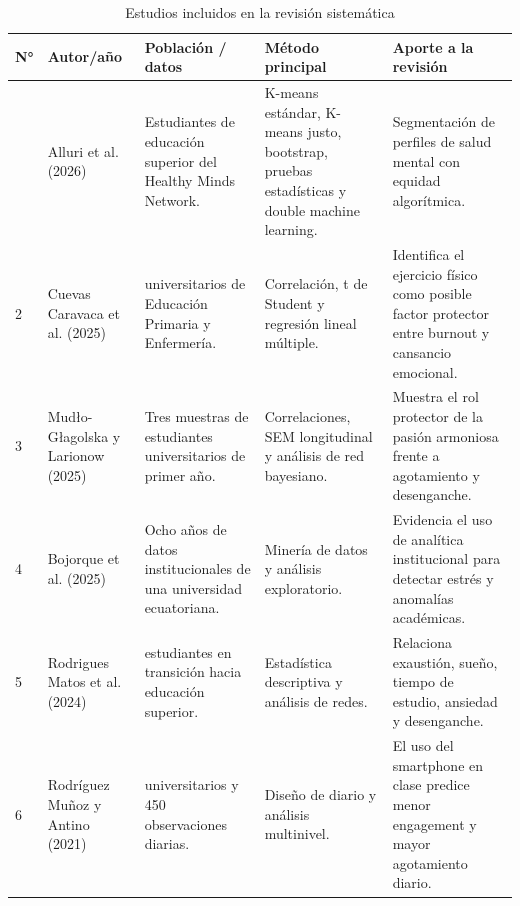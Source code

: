 \documentclass[12pt,a4paper]{article}
\renewcommand{\arraystretch}{1.12}
\begin{document}
\begin{table}[H]
\centering
\caption{Estudios incluidos en la revisión sistemática}
\label{tab:estudios_incluidos}
\renewcommand{\arraystretch}{1.15}
\scriptsize

\begin{tabularx}{\textwidth}{|
>{\centering\arraybackslash}p{}|
>{\raggedright\arraybackslash}p{}|
>{\raggedright\arraybackslash}p{}|
>{\raggedright\arraybackslash}p{}|
>{\raggedright\arraybackslash}X|}
\hline

\textbf{N°} &
\textbf{Autor/año} &
\textbf{Población / datos} &
\textbf{Método principal} &
\textbf{Aporte a la revisión} \\
\hline

1 &
Alluri et al. (2026) &
Estudiantes de educación superior del Healthy Minds Network. &
K-means estándar, K-means justo, bootstrap, pruebas estadísticas y double machine learning. &
Segmentación de perfiles de salud mental con equidad algorítmica. \\
\hline

2 &
Cuevas Caravaca et al. (2025) &
789 universitarios de Educación Primaria y Enfermería. &
Correlación, t de Student y regresión lineal múltiple. &
Identifica el ejercicio físico como posible factor protector entre burnout y cansancio emocional. \\
\hline

3 &
Mudło-Głagolska y Larionow (2025) &
Tres muestras de estudiantes universitarios de primer año. &
Correlaciones, SEM longitudinal y análisis de red bayesiano. &
Muestra el rol protector de la pasión armoniosa frente a agotamiento y desenganche. \\
\hline

4 &
Bojorque et al. (2025) &
Ocho años de datos institucionales de una universidad ecuatoriana. &
Minería de datos y análisis exploratorio. &
Evidencia el uso de analítica institucional para detectar estrés y anomalías académicas. \\
\hline

5 &
Rodrigues Matos et al. (2024) &
401 estudiantes en transición hacia educación superior. &
Estadística descriptiva y análisis de redes. &
Relaciona exaustión, sueño, tiempo de estudio, ansiedad y desenganche. \\
\hline

6 &
Rodríguez Muñoz y Antino (2021) &
45 universitarios y 450 observaciones diarias. &
Diseño de diario y análisis multinivel. &
El uso del smartphone en clase predice menor engagement y mayor agotamiento diario. \\
\hline

\end{tabularx}
\end{table}
\end{document}
